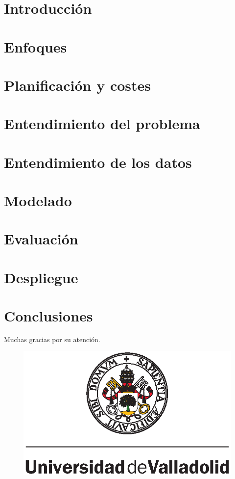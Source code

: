 \documentclass[xcolor=dvipsnames]{beamer}
\newif\ifshownumber
\begin{document}
\AtBeginSection{\frame{\sectionpage}}
\shownumberfalse



\section{Introducción}
\shownumbertrue


\shownumberfalse
\section{Enfoques}
\shownumbertrue


\shownumberfalse
\section{Planificación y costes}
\shownumbertrue


\shownumberfalse
\section{Entendimiento del problema}
\shownumbertrue


\shownumberfalse
\section{Entendimiento de los datos}
\shownumbertrue


\shownumberfalse
\section{Modelado}
\shownumbertrue


\shownumberfalse
\section{Evaluación}
\shownumbertrue


\shownumberfalse
\section{Despliegue}
\shownumbertrue


\shownumberfalse
\section{Conclusiones}
\shownumbertrue


\shownumberfalse
\label{ultima}
\begin{frame}
\begin{center}
        {\Huge Muchas gracias por su atención.}
    \end{center}
    \begin{figure}[H]
        \begin{center}
            \includegraphics[width=0.25\linewidth]{img/uva.eps}
        \end{center}
    \end{figure}

\end{frame}
\end{document}
